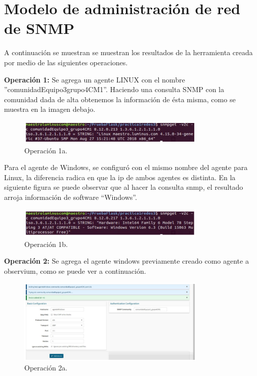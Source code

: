\section{Modelo de administración de red de SNMP}

\noindent
A continuación se muestran se muestran los resultados de la herramienta creada por medio de las siguientes operaciones.

\noindent
\newline
\textbf{Operación 1:} Se agrega un agente LINUX con el nombre ''comunidadEquipo3grupo4CM1''. Haciendo una consulta SNMP con la comunidad dada de alta obtenemos la información de ésta misma, como se muestra en la imagen debajo.  
 
\begin{figure}[htbp!]
	\centering
		\includegraphics[width=0.8\textwidth]{images/tarea3/op1}
	\caption{Operación 1a.}
\end{figure}

\noindent
Para el agente de Windows, se configuró con el mismo nombre del agente para Linux, la diferencia radica en que la ip de ambos agentes es distinta. En la siguiente figura se puede observar que al hacer la consulta snmp, el resultado arroja información de software “Windows”. 

\begin{figure}[htbp!]
	\centering
		\includegraphics[width=0.8\textwidth]{images/tarea3/op1b}
	\caption{Operación 1b.}
\end{figure}

\noindent
\textbf{Operación 2:} Se agrega el agente windows previamente creado como agente a observium, como se puede ver a continuación.

\begin{figure}[htbp!]
	\centering
		\includegraphics[width=0.8\textwidth]{images/tarea3/op2a}
	\caption{Operación 2a.}
\end{figure}

